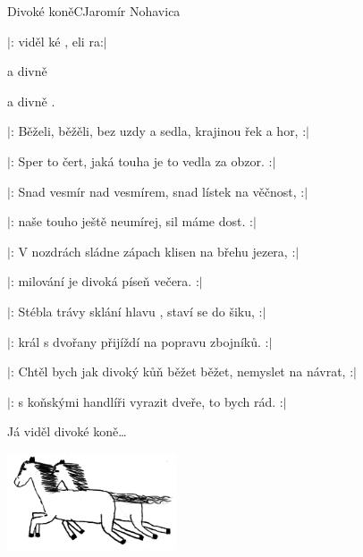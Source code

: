 \begin{song}{Divoké koně}{C}{Jaromír Nohavica}

\begin{SBVerse}

$|$: viděl ké , eli ra:$|$

  a divně  

   a divně  .

\end{SBVerse}

\begin{SBVerse}
$|$: Běželi, běžěli, bez uzdy a sedla, krajinou řek a hor, :$|$

$|$: Sper to čert, jaká touha je to vedla za obzor. :$|$
\end{SBVerse}

\begin{SBVerse}

$|$: Snad vesmír nad vesmírem, snad lístek na věčnost, :$|$

$|$: naše touho ještě neumírej, sil máme dost. :$|$

\end{SBVerse}

\begin{SBVerse}
$|$: V nozdrách sládne zápach klisen na břehu jezera, :$|$

$|$: milování je divoká píseň večera. :$|$
\end{SBVerse}

\begin{SBVerse}
$|$: Stébla trávy sklání hlavu , staví se do šiku, :$|$

$|$: král s dvořany přijíždí na popravu zbojníků. :$|$
\end{SBVerse}

\begin{SBVerse}
$|$: Chtěl bych jak divoký kůň běžet běžet, nemyslet na návrat, :$|$

$|$: s koňskými handlíři vyrazit dveře, to bych rád. :$|$
\end{SBVerse}

\begin{SBVerse}
Já viděl divoké koně\dots
\end{SBVerse}
\begin{center}
\includegraphics[width=5cm]{pict/divoci_kone}
\end{center}
\end{song}

\pagebreak